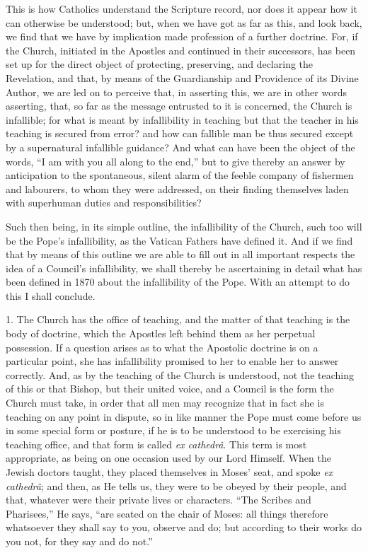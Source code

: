 This is how Catholics understand the Scripture record, nor does it
appear how it can otherwise be understood; but, when we have got as far
as this, and look back, we find that we have by implication made
profession of a further doctrine. For, if the Church, initiated in the
Apostles and continued in their successors, has been set up for the
direct object of protecting, preserving, and declaring the Revelation,
and that, by means of the Guardianship and Providence of its Divine
Author, we are led on to perceive that, in asserting this, we are in
other words asserting, that, so far as the message entrusted to it is
concerned, the Church is infallible; for what is meant by infallibility
in teaching but that the teacher in his teaching is secured from error?
and how can fallible man be thus secured except by a supernatural
infallible guidance? And what can have been the object of the words,
``I am with you all along to the end,'' but to give thereby an
answer by anticipation to the spontaneous, silent alarm of the feeble
company of fishermen and labourers, to whom they were addressed,
on their finding themselves laden with superhuman duties and
responsibilities?

Such then being, in its simple outline, the infallibility of the
Church, such too will be the Pope's infallibility, as the Vatican
Fathers have defined it. And if we find that by means of this outline we
are able to fill out in all important respects the idea of a Council's
infallibility, we shall thereby be ascertaining in detail what has been
defined in 1870 about the infallibility of the Pope. With an attempt to
do this I shall conclude.

1. The Church has the office of teaching, and the matter of that
teaching is the body of doctrine, which the Apostles left behind them as
her perpetual possession. If a question arises as to what the Apostolic
doctrine is on a particular point, she has infallibility promised to her
to enable her to answer correctly. And, as by the teaching of the Church
is understood, not the teaching of this or that Bishop, but their united
voice, and a Council is the form the Church must take, in order that all
men may recognize that in fact she is teaching on any point in dispute,
so in like manner the Pope must come before us in some special form or
posture, if he is to be understood to be exercising his teaching office,
and that form is called \emph{ex cathedrâ}. This term is most
appropriate, as being on one occasion used by our Lord Himself. When the
Jewish doctors taught, they placed themselves in Moses' seat, and spoke \emph{ex
cathedrâ}; and then, as He tells us, they were to be obeyed by their
people, and that, whatever were their private lives or characters.
``The Scribes and Pharisees,'' He says, ``are seated
on the chair of Moses: all things therefore whatsoever they shall say to
you, observe and do; but according to their works do you not, for they
say and do not.''

